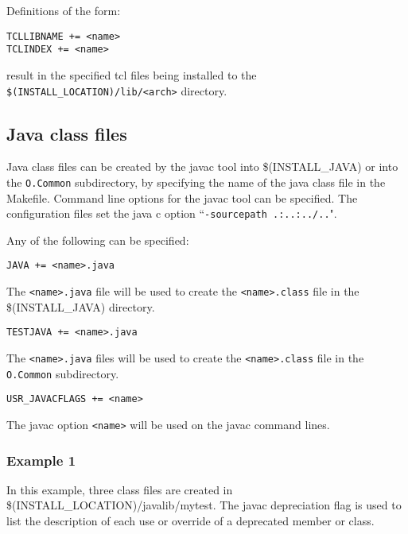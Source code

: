 Definitions of the form:

\begin{verbatim}
TCLLIBNAME += <name>
TCLINDEX += <name>
\end{verbatim}

result in the specified tcl files being installed to the \verb|$(INSTALL_LOCATION)/lib/<arch>| directory.

\subsection{Java class files}

Java class files can be created by the javac tool into \$(INSTALL\_JAVA) or into the \verb|O.Common| subdirectory, by 
specifying the name of the java class file in the Makefile. Command line options for the javac tool can be specified. The 
configuration files set the java c option ``\verb|-sourcepath .:..:../..|".

Any of the following can be specified:

\begin{description}

\item {}\verb|JAVA += <name>.java|

The \verb|<name>.java| file will be used to create the \verb|<name>.class| file in the \$(INSTALL\_JAVA) directory.

\item {}\verb|TESTJAVA += <name>.java|

The \verb|<name>.java| files will be used to create the \verb|<name>.class| file in the \verb|O.Common| subdirectory.

\item {}\verb|USR_JAVACFLAGS += <name>|

The javac option \verb|<name>| will be used on the javac command lines.

\end{description}

\subsubsection{Example 1}

In this example, three class files are created in \$(INSTALL\_LOCATION)/javalib/mytest. The javac depreciation flag is 
used to list the description of each use or override of a deprecated member or class.

